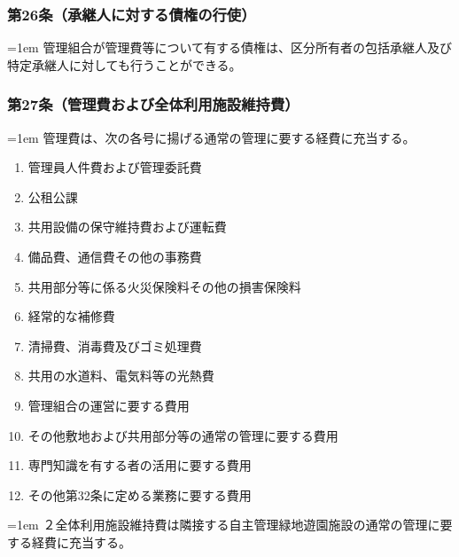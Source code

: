 \documentclass[
  luatex,
  paper=a4paper,
  fontsize=11pt,
  jafontsize=11pt,
  jlreq_notes,
]{jlreq}
\newcommand{\joumain}[1]{%
  \noindent\hangindent=1em\hangafter=1
  \hspace{1em}#1%
}
\newcommand{\kou}[2]{%
  \par\noindent\hangindent=1em\hangafter=1
  #1\hspace{1em}#2%
}
\begin{document}
  \subsubsection*{第26条（承継人に対する債権の行使）}
  \joumain{管理組合が管理費等について有する債権は、区分所有者の包括承継人及び特定承継人に対しても行うことができる。}

  \subsubsection*{第27条（管理費および全体利用施設維持費）}
  \joumain{管理費は、次の各号に揚げる通常の管理に要する経費に充当する。}
  \begin{enumerate}
    \item 管理員人件費および管理委託費
    \item 公租公課
    \item 共用設備の保守維持費および運転費
    \item 備品費、通信費その他の事務費
    \item 共用部分等に係る火災保険料その他の損害保険料
    \item 経常的な補修費
    \item 清掃費、消毒費及びゴミ処理費
    \item 共用の水道料、電気料等の光熱費
    \item 管理組合の運営に要する費用
    \item その他敷地および共用部分等の通常の管理に要する費用
    \item 専門知識を有する者の活用に要する費用
    \item その他第32条に定める業務に要する費用
  \end{enumerate}
  \kou{２}{全体利用施設維持費は隣接する自主管理緑地遊園施設の通常の管理に要する経費に充当する。}
\end{document}
